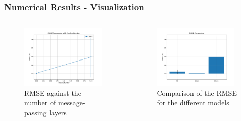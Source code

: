 \documentclass{beamer}
\begin{document}
\begin{frame}
    \frametitle{Numerical Results - Visualization}
    \begin{columns}
        \begin{figure}
            \centering
            \includegraphics[width=0.95\textwidth]{Images/metrics_plots/5k/rmse_line_plot.png}
            \caption{RMSE against the number of message-passing layers}
            \end{figure}
        \begin{figure}
            \centering
            \includegraphics[width=0.95\textwidth]{Images/metrics_plots/5k/rmse_histogram.png}
            \caption{Comparison of the RMSE for the different models}
        \end{figure}
    \end{columns}
\end{frame}
\end{document}
